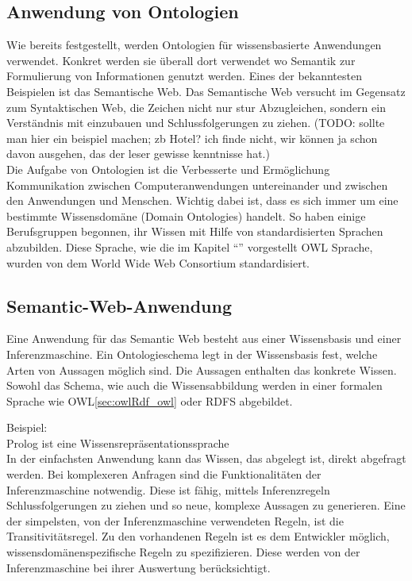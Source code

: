 \subsection{Anwendung von Ontologien}
\label{subsec:ontologien_onto_anwendung}
Wie bereits festgestellt, werden Ontologien für wissensbasierte Anwendungen verwendet. Konkret werden sie überall dort verwendet wo Semantik zur Formulierung von Informationen genutzt werden. Eines der bekanntesten Beispielen ist das Semantische Web. Das Semantische Web versucht im Gegensatz zum Syntaktischen Web, die Zeichen nicht nur stur Abzugleichen, sondern ein Verständnis mit einzubauen und Schlussfolgerungen zu ziehen. (TODO: sollte man hier ein beispiel machen; zb Hotel? ich finde nicht, wir können ja schon davon ausgehen, das der leser gewisse kenntnisse hat.)\\

Die Aufgabe von Ontologien ist die Verbesserte und Ermöglichung Kommunikation zwischen Computeranwendungen untereinander und zwischen den Anwendungen und Menschen. Wichtig dabei ist, dass es sich immer um eine bestimmte Wissensdomäne (Domain Ontologies) handelt. So haben einige Berufsgruppen begonnen, ihr Wissen mit Hilfe von standardisierten Sprachen abzubilden. Diese Sprache, wie die im Kapitel "`"' vorgestellt OWL Sprache, wurden von dem World Wide Web Consortium standardisiert.



\subsection{Semantic-Web-Anwendung}
\label{subsec:ontologien_onto_SemantikWebAnwendung}
Eine Anwendung für das Semantic Web besteht aus einer Wissensbasis und einer Inferenzmaschine. Ein Ontologieschema legt in der Wissensbasis fest, welche Arten von Aussagen möglich sind. Die Aussagen enthalten das konkrete Wissen. Sowohl das Schema, wie auch die Wissensabbildung werden in einer formalen Sprache wie OWL\ref{sec:owlRdf_owl} oder RDFS abgebildet.

Beispiel:\\
\noindent\hspace*{15mm} Prolog ist eine Wissensrepräsentationssprache\\

In der einfachsten Anwendung kann das Wissen, das abgelegt ist, direkt abgefragt werden. Bei komplexeren Anfragen sind die Funktionalitäten der Inferenzmaschine notwendig. Diese ist fähig, mittels Inferenzregeln Schlussfolgerungen zu ziehen und so neue, komplexe Aussagen zu generieren. Eine der simpelsten, von der Inferenzmaschine verwendeten Regeln, ist die Transitivitätsregel. 
Zu den vorhandenen Regeln ist es dem Entwickler möglich, wissensdomänenspezifische Regeln zu spezifizieren. Diese werden von der Inferenzmaschine bei ihrer Auswertung berücksichtigt.

